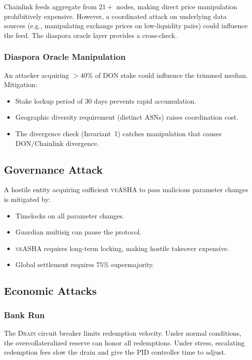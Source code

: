 \documentclass[11pt,a4paper]{article}
\newcommand{\veasha}{\textsc{veASHA}\xspace}
\begin{document}
Chainlink feeds aggregate from $21+$ nodes, making direct price manipulation prohibitively expensive.
However, a coordinated attack on underlying data sources (e.g., manipulating exchange prices on low-liquidity pairs) could influence the feed.
The diaspora oracle layer provides a cross-check.

\subsubsection{Diaspora Oracle Manipulation}

An attacker acquiring $>40\%$ of DON stake could influence the trimmed median.
Mitigation:
\begin{itemize}
  \item Stake lockup period of $30$ days prevents rapid accumulation.
  \item Geographic diversity requirement (distinct ASNs) raises coordination cost.
  \item The divergence check (Invariant~1) catches manipulation that causes DON/Chainlink divergence.
\end{itemize}

\subsection{Governance Attack}

A hostile entity acquiring sufficient \veasha to pass malicious parameter changes is mitigated by:
\begin{itemize}
  \item Timelocks on all parameter changes.
  \item Guardian multisig can pause the protocol.
  \item \veasha requires long-term locking, making hostile takeover expensive.
  \item Global settlement requires $75\%$ supermajority.
\end{itemize}

\subsection{Economic Attacks}

\subsubsection{Bank Run}

The \textsc{Drain} circuit breaker limits redemption velocity.
Under normal conditions, the overcollateralized reserve can honor all redemptions.
Under stress, escalating redemption fees slow the drain and give the PID controller time to adjust.
\end{document}
